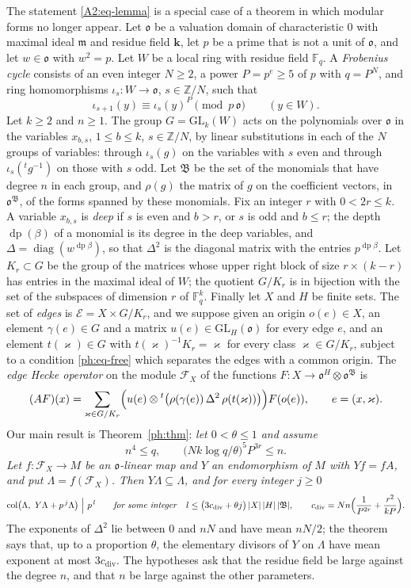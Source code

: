 \documentclass[10pt]{amsart}
\theoremstyle{definition}
\theoremstyle{remark}
\newcommand{\Z}{\mathbb Z}
\providecommand{\auF}{\mathbb F}
\providecommand{\auGL}{\mathrm{GL}}
\providecommand{\aucol}{\operatorname{col}}
\providecommand{\pam}{\mathfrak m}
\providecommand{\pao}{\mathfrak o}
\providecommand{\phB}{\mathfrak B}
\providecommand{\phcd}{c_{\mathrm{div}}}
\providecommand{\phdep}{\operatorname{dp}}
\providecommand{\phk}{\boldsymbol k}
\begin{document}
The statement \eqref{A2:eq-lemma} is a special case of a theorem in which modular forms no longer
appear. Let $\pao$ be a valuation domain of characteristic $0$ with maximal ideal $\pam$ and
residue field $\phk$, let $p$ be a prime that is not a unit of $\pao$, and let $w\in\pao$ with
$w^2=p$. Let $W$ be a local ring with residue field $\auF_q$. A \emph{Frobenius cycle} consists of
an even integer $N\ge2$, a power $P=p^e\ge5$ of $p$ with $q=P^N$, and ring homomorphisms
$\iota_s\colon W\to\pao$, $s\in\Z/N$, such that
\[
\iota_{s+1}(y)\equiv\iota_s(y)^P\pmod{p\,\pao}\qquad(y\in W).
\]
Let $k\ge2$ and $n\ge1$. The group $G=\auGL_k(W)$ acts on the polynomials over $\pao$ in the
variables $x_{b,s}$, $1\le b\le k$, $s\in\Z/N$, by linear substitutions in each of the $N$ groups
of variables: through $\iota_s(g)$ on the variables with $s$ even and through
$\iota_s({}^tg^{-1})$ on those with $s$ odd. Let $\phB$ be the set of the monomials that have
degree $n$ in each group, and $\rho(g)$ the matrix of $g$ on the coefficient vectors, in
$\pao^\phB$, of the forms spanned by these monomials. Fix an integer $r$ with $0<2r\le k$. A
variable $x_{b,s}$ is \emph{deep} if $s$ is even and $b>r$, or $s$ is odd and $b\le r$; the depth
$\phdep(\beta)$ of a monomial is its degree in the deep variables, and
$\Delta=\operatorname{diag}(w^{\phdep\beta})$, so that $\Delta^2$ is the diagonal matrix with the
entries $p^{\phdep\beta}$. Let $K_r\subset G$ be the group of the matrices whose upper right block
of size $r\times(k-r)$ has entries in the maximal ideal of $W$; the quotient $G/K_r$ is in
bijection with the set of the subspaces of dimension $r$ of $\auF_q^k$. Finally let $X$ and $H$ be
finite sets. The set of \emph{edges} is $\mathcal E=X\times G/K_r$, and we suppose given an origin
$o(e)\in X$, an element $\gamma(e)\in G$ and a matrix $u(e)\in\auGL_H(\pao)$ for every edge $e$,
and an element $t(\varkappa)\in G$ with $t(\varkappa)^{-1}K_r=\varkappa$ for every class
$\varkappa\in G/K_r$, subject to a condition \eqref{ph:eq-free} which separates the edges with a
common origin. The \emph{edge Hecke operator} on the module $\mathcal F_X$ of the functions
$F\colon X\to\pao^H\otimes\pao^\phB$ is
\[
(AF)(x)=\sum_{\varkappa\in G/K_r}\Bigl(u(e)\otimes{}^t\bigl(\rho(\gamma(e))\,\Delta^2\,
\rho(t(\varkappa))\bigr)\Bigr)F(o(e)),\qquad e=(x,\varkappa).
\]
Our main result is Theorem~\ref{ph:thm}: \emph{let $0<\theta\le1$ and assume
\[
n^4\le q,\qquad\bigl(Nk\log q/\theta\bigr)^5P^{3r}\le n .
\]
Let $f\colon\mathcal F_X\to M$ be an $\pao$-linear map and $Y$ an endomorphism of $M$ with
$Yf=fA$, and put $\Lambda=f(\mathcal F_X)$. Then $Y\Lambda\subseteq\Lambda$, and for every integer
$j\ge0$}
\[
\aucol\bigl(\Lambda,\ Y\Lambda+p^{\,j}\Lambda\bigr)\ \Big|\ p^{\,l}\qquad\text{\emph{for some
integer}}\quad l\le\bigl(3\phcd+\theta j\bigr)\,|X|\,|H|\,|\phB|,\qquad
\phcd=Nn\Bigl(\frac1{P^{2r}}+\frac{r^2}{kP}\Bigr).
\]
The exponents of $\Delta^2$ lie between $0$ and $nN$ and have mean $nN/2$; the theorem says that,
up to a proportion $\theta$, the elementary divisors of $Y$ on $\Lambda$ have mean exponent at
most $3\phcd$. The hypotheses ask that the residue field be large against the degree $n$, and
that $n$ be large against the other parameters.
\end{document}
